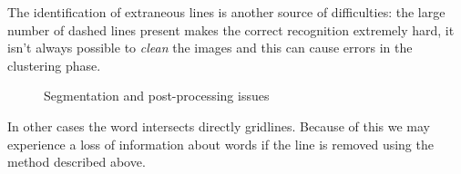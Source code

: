 The identification of extraneous lines is another source of difficulties: the large number of dashed lines present makes the correct recognition extremely hard, it isn't always possible to \emph{clean} the images and this can cause errors in the clustering phase.

\begin{figure}[!ht]
 \centering
 \hspace{5mm}
 \caption{Segmentation and post-processing issues}
 \end{figure}
\hspace{1mm}
In other cases the word intersects directly gridlines. Because of this we may experience a loss of information about words if the line is removed using the method described above.

